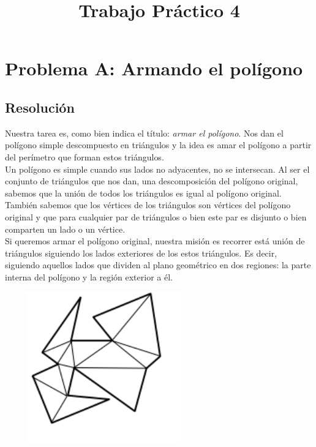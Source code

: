 \documentclass[a4paper]{article}
\title{Trabajo Práctico 4}
\begin{document}
\maketitle

\section{Problema A: Armando el polígono}

\subsection{Resolución}

Nuestra tarea es, como bien indica el título: \textit{armar el polígono}.
Nos dan el polígono simple descompuesto en triángulos y la idea es amar el polígono a partir del perímetro que forman estos triángulos.\\
Un polígono es simple cuando sus lados no adyacentes, no se intersecan.
Al ser el conjunto de triángulos que nos dan, una descomposición del polígono original, sabemos que la unión de todos los triángulos es igual al polígono original. También sabemos que los vértices de los triángulos son vértices del polígono original y que para cualquier par de triángulos o bien este par es disjunto o bien comparten un lado o un vértice.\\

Si queremos armar el polígono original, nuestra misión es recorrer está unión de triángulos siguiendo los lados exteriores de los estos triángulos. Es decir, siguiendo aquellos lados que dividen al plano geométrico en dos regiones: la parte interna del polígono y la región exterior a él.\\

\begin{center}
\includegraphics[width=8.5cm,height=6.5cm,keepaspectratio]{poligonoTriangulado.png}
\end{center}
\end{document}

